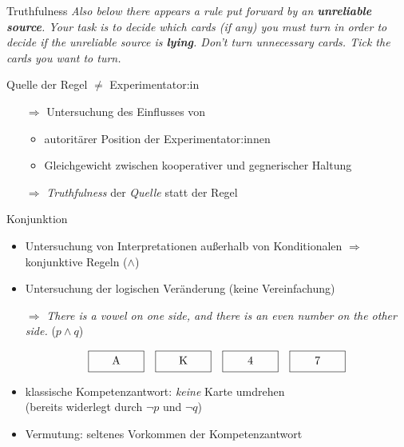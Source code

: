 \begin{frame}{Truthfulness {\scriptsize \cite[S.~97-98]{stenningHumanReasoningCognitive2008}}}
    \emph{ \small
        Also below there appears a rule {\normalsize \alert{put forward by an \textbf{unreliable source}}}.
        Your task is to decide which cards (if any) you must turn in order to decide {\normalsize \alert{if the unreliable source is \textbf{lying}}}.
        Don't turn unnecessary cards. Tick the cards you want to turn.
    }
    
    Quelle der Regel $\ne$ Experimentator:in

    \pause
    \begin{itemize}
        \item[$\Rightarrow$] Untersuchung des Einflusses von
        \begin{itemize}
            \item autoritärer Position der Experimentator:innen
            \item Gleichgewicht zwischen kooperativer und gegnerischer Haltung
        \end{itemize}

        \item[$\Rightarrow$] \emph{Truthfulness} der \emph{Quelle} statt der Regel
    \end{itemize}
\end{frame}


\begin{frame}{Konjunktion {\scriptsize \cite[S.~99]{stenningHumanReasoningCognitive2008}}}
    \begin{itemize}
        \item Untersuchung von Interpretationen außerhalb von Konditionalen
            $\Rightarrow$ konjunktive Regeln ($\land$)
        
        \item Untersuchung der logischen Veränderung (keine Vereinfachung)
        
        \item[$\Rightarrow$] \emph{There is a vowel on one side, \alert{and} there is an even number on the other side.} ($p \land q$)
        
        \[
            \framebox[5em][c]{A\strut}\quad
            \framebox[5em][c]{K\strut}\quad
            \framebox[5em][c]{4\strut}\quad
            \framebox[5em][c]{7\strut}
        \]
    \end{itemize}

    \pause
    \begin{itemize}
        \item klassische Kompetenzantwort: \emph{keine} Karte umdrehen \\
            {\footnotesize (bereits widerlegt durch $\lnot p$ und $\lnot q$)}
        
        \item Vermutung: seltenes Vorkommen der Kompetenzantwort
    \end{itemize}
\end{frame}


